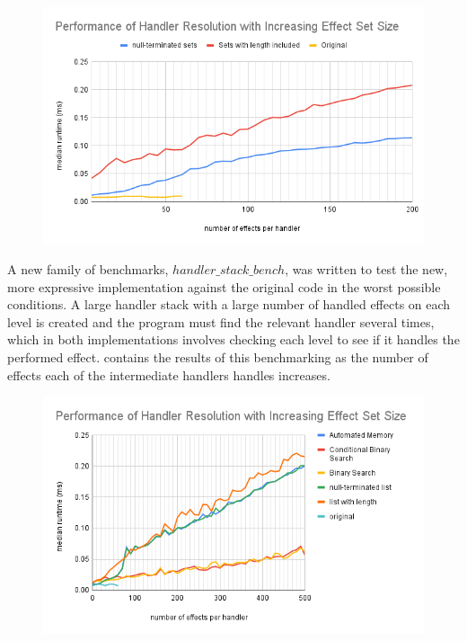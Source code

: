 \documentclass[logo,bsc,singlespacing,parskip,online]{infthesis}
\begin{document}
\begin{figure}[ht]
    \centering
    \includegraphics[width=\linewidth]{width_parametrized_performance.png}
    \caption{}
    \label{fig:adjusted}
\end{figure}

A new family of benchmarks, $handler\_stack\_bench$, was written to test the new, more expressive implementation against the original code in the worst possible conditions. A large handler stack with a large number of handled effects on each level is created and the program must find the relevant handler several times, which in both implementations involves checking each level to see if it handles the performed effect.  contains the results of this benchmarking as the number of effects each of the intermediate handlers handles increases.

\begin{figure}[ht]
    \centering
    \includegraphics[width=\linewidth]{lines_new.png}
    \caption{}
    \label{fig:parametrized_actual}
\end{figure}
\end{document}
